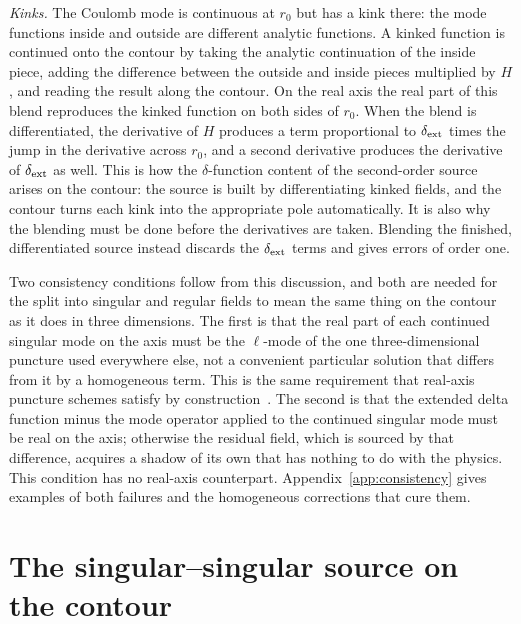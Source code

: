 \documentclass[aps,prd,twocolumn,superscriptaddress,nofootinbib,floatfix]{revtex4-2}
\newcommand{\dext}{\delta_{\rm ext}}
\begin{document}
\emph{Kinks.}
The Coulomb mode is continuous at $r_0$ but has a kink there: the mode functions inside and outside are different analytic functions.
A kinked function is continued onto the contour by taking the analytic continuation of the inside piece, adding the difference between the outside and inside pieces multiplied by $H$, and reading the result along the contour.
On the real axis the real part of this blend reproduces the kinked function on both sides of $r_0$.
When the blend is differentiated, the derivative of $H$ produces a term proportional to $\dext$ times the jump in the derivative across $r_0$, and a second derivative produces the derivative of $\dext$ as well.
This is how the $\delta$-function content of the second-order source arises on the contour: the source is built by differentiating kinked fields, and the contour turns each kink into the appropriate pole automatically.
It is also why the blending must be done before the derivatives are taken.
Blending the finished, differentiated source instead discards the $\dext$ terms and gives errors of order one.

Two consistency conditions follow from this discussion, and both are needed for the split into singular and regular fields to mean the same thing on the contour as it does in three dimensions.
The first is that the real part of each continued singular mode on the axis must be the $\ell$-mode of the one three-dimensional puncture used everywhere else, not a convenient particular solution that differs from it by a homogeneous term.
This is the same requirement that real-axis puncture schemes satisfy by construction~\cite{Upton2026}.
The second is that the extended delta function minus the mode operator applied to the continued singular mode must be real on the axis; otherwise the residual field, which is sourced by that difference, acquires a shadow of its own that has nothing to do with the physics.
This condition has no real-axis counterpart.
Appendix~\ref{app:consistency} gives examples of both failures and the homogeneous corrections that cure them.

\section{The singular--singular source on the contour}\label{sec:ss}
\end{document}

